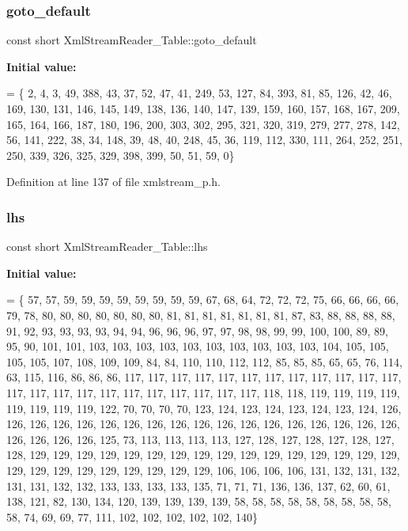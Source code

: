 \subsubsection{\texorpdfstring{goto\+\_\+default}{goto\_default}}
{\footnotesize\ttfamily const short Xml\+Stream\+Reader\+\_\+\+Table\+::goto\+\_\+default\hspace{0.3cm}{\ttfamily [static]}}

{\bfseries Initial value\+:}
\begin{DoxyCode}
= \{
  2, 4, 3, 49, 388, 43, 37, 52, 47, 41, 
  249, 53, 127, 84, 393, 81, 85, 126, 42, 46, 
  169, 130, 131, 146, 145, 149, 138, 136, 140, 147, 
  139, 159, 160, 157, 168, 167, 209, 165, 164, 166, 
  187, 180, 196, 200, 303, 302, 295, 321, 320, 319, 
  279, 277, 278, 142, 56, 141, 222, 38, 34, 148, 
  39, 48, 40, 248, 45, 36, 119, 112, 330, 111, 
  264, 252, 251, 250, 339, 326, 325, 329, 398, 399, 
  50, 51, 59, 0\}
\end{DoxyCode}


Definition at line 137 of file xmlstream\+\_\+p.\+h.

\mbox{\label{class_xml_stream_reader___table_aa65a3ebaac630bc360e6a736a2e942da}} 
\subsubsection{\texorpdfstring{lhs}{lhs}}
{\footnotesize\ttfamily const short Xml\+Stream\+Reader\+\_\+\+Table\+::lhs\hspace{0.3cm}{\ttfamily [static]}}

{\bfseries Initial value\+:}
\begin{DoxyCode}
= \{
  57, 57, 59, 59, 59, 59, 59, 59, 59, 59, 
  67, 68, 64, 72, 72, 72, 75, 66, 66, 66, 
  66, 79, 78, 80, 80, 80, 80, 80, 80, 80, 
  81, 81, 81, 81, 81, 81, 81, 87, 83, 88, 
  88, 88, 88, 91, 92, 93, 93, 93, 93, 94, 
  94, 96, 96, 96, 97, 97, 98, 98, 99, 99, 
  100, 100, 89, 89, 95, 90, 101, 101, 103, 103, 
  103, 103, 103, 103, 103, 103, 103, 103, 104, 105, 
  105, 105, 105, 107, 108, 109, 109, 84, 84, 110, 
  110, 112, 112, 85, 85, 85, 65, 65, 76, 114, 
  63, 115, 116, 86, 86, 86, 117, 117, 117, 117, 
  117, 117, 117, 117, 117, 117, 117, 117, 117, 117, 
  117, 117, 117, 117, 117, 117, 117, 117, 117, 118, 
  118, 119, 119, 119, 119, 119, 119, 119, 119, 122, 
  70, 70, 70, 70, 123, 124, 123, 124, 123, 124, 
  123, 124, 126, 126, 126, 126, 126, 126, 126, 126, 
  126, 126, 126, 126, 126, 126, 126, 126, 126, 126, 
  126, 126, 126, 126, 125, 73, 113, 113, 113, 113, 
  127, 128, 127, 128, 127, 128, 127, 128, 129, 129, 
  129, 129, 129, 129, 129, 129, 129, 129, 129, 129, 
  129, 129, 129, 129, 129, 129, 129, 129, 129, 129, 
  129, 129, 129, 106, 106, 106, 106, 131, 132, 131, 
  132, 131, 131, 132, 132, 133, 133, 133, 133, 135, 
  71, 71, 71, 136, 136, 137, 62, 60, 61, 138, 
  121, 82, 130, 134, 120, 139, 139, 139, 139, 58, 
  58, 58, 58, 58, 58, 58, 58, 58, 58, 74, 
  69, 69, 77, 111, 102, 102, 102, 102, 102, 140\}
\end{DoxyCode}


